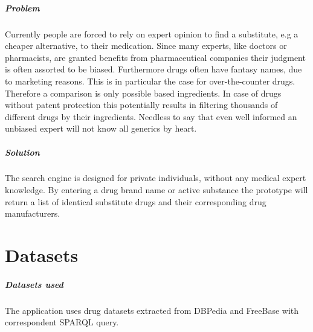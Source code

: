 \documentclass[11pt,titlepage,oneside,openany]{book}
\begin{document}
\paragraph{Problem} \label{sec:problem}
Currently people are forced to rely on expert opinion to find a substitute, e.g a cheaper alternative, to their medication. Since many experts, like doctors or pharmacists, are granted benefits from pharmaceutical companies their judgment is often assorted to be biased.
Furthermore drugs often have fantasy names, due to marketing reasons. This is in particular the case for over-the-counter drugs. Therefore a comparison is only possible based ingredients.
In case of drugs without patent protection this potentially results in filtering thousands of different drugs by their ingredients. Needless to say that even well informed an unbiased expert will not know all generics by heart.



\paragraph{Solution} 
The search engine is designed for private individuals, without any medical expert knowledge.
\label{sec:solution} %
 By entering a drug brand name or active substance the prototype will return a list of identical substitute drugs and their corresponding drug manufacturers.





\chapter{Datasets}
\label{cha:datasets}

\paragraph{Datasets used}
\label{sec:datasets_used}
The application uses drug datasets extracted from DBPedia and FreeBase with correspondent SPARQL query.
\end{document}
